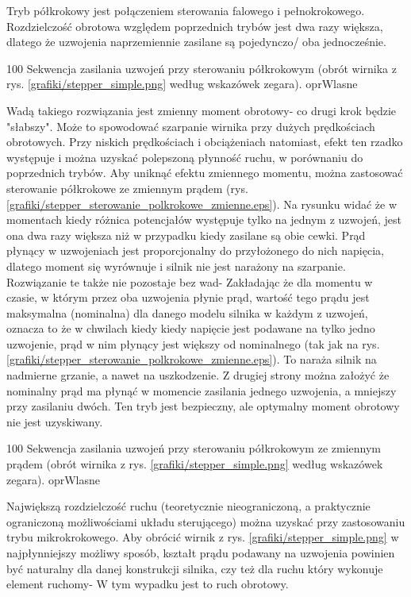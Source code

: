 
Tryb półkrokowy jest połączeniem sterowania falowego i pełnokrokowego. Rozdzielczość obrotowa względem poprzednich trybów jest dwa razy większa, dlatego że uzwojenia naprzemiennie zasilane są pojedynczo/ oba jednocześnie.

		{100}
		{Sekwencja zasilania uzwojeń przy sterowaniu półkrokowym (obrót wirnika z rys. \ref{grafiki/stepper_simple.png} według wskazówek zegara).}
		{oprWlasne}
		
Wadą takiego rozwiązania jest zmienny moment obrotowy- co drugi krok będzie "słabszy". Może to spowodować szarpanie wirnika przy dużych prędkościach obrotowych. Przy niskich prędkościach i obciążeniach natomiast, efekt ten rzadko występuje i można uzyskać polepszoną płynność ruchu, w porównaniu do poprzednich trybów. Aby uniknąć efektu zmiennego momentu, można zastosować sterowanie półkrokowe ze zmiennym prądem (rys. \ref{grafiki/stepper_sterowanie_polkrokowe_zmienne.eps}). Na rysunku widać że w momentach kiedy różnica potencjałów występuje tylko na jednym z uzwojeń, jest ona dwa razy większa niż w przypadku kiedy zasilane są obie cewki. Prąd płynący w uzwojeniach jest proporcjonalny do przyłożonego do nich napięcia, dlatego moment się wyrównuje i silnik nie jest narażony na szarpanie. Rozwiązanie te także nie pozostaje bez wad- Zakładając że dla momentu w czasie, w którym przez oba uzwojenia płynie prąd, wartość tego prądu jest maksymalna (nominalna) dla danego modelu silnika w każdym z uzwojeń, oznacza to że w chwilach kiedy kiedy napięcie jest podawane na tylko jedno uzwojenie, prąd w nim płynący jest większy od nominalnego (tak jak na rys. \ref{grafiki/stepper_sterowanie_polkrokowe_zmienne.eps}). To naraża silnik na nadmierne grzanie, a nawet na uszkodzenie. Z drugiej strony można założyć że nominalny prąd ma płynąć w momencie zasilania jednego uzwojenia, a mniejszy przy zasilaniu dwóch. Ten tryb jest bezpieczny, ale optymalny moment obrotowy nie jest uzyskiwany.

		{100}
		{Sekwencja zasilania uzwojeń przy sterowaniu półkrokowym ze zmiennym prądem (obrót wirnika z rys. \ref{grafiki/stepper_simple.png} według wskazówek zegara).}
		{oprWlasne}
		

Największą rozdzielczość ruchu (teoretycznie nieograniczoną, a praktycznie ograniczoną możliwościami układu sterującego) można uzyskać przy zastosowaniu trybu mikrokrokowego. Aby obrócić wirnik z rys. \ref{grafiki/stepper_simple.png} w najpłynniejszy możliwy sposób, kształt prądu podawany na uzwojenia powinien być naturalny dla danej konstrukcji silnika, czy też dla ruchu który wykonuje element ruchomy- W tym wypadku jest to ruch obrotowy. 

